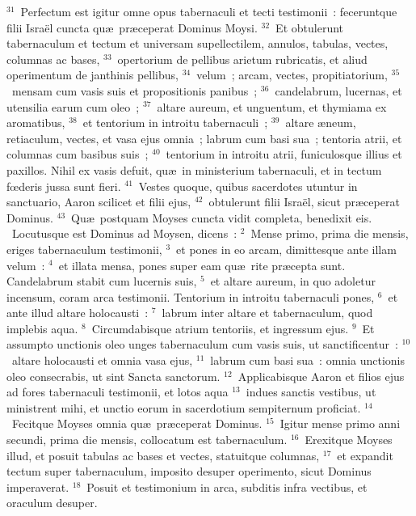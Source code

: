 ${}^{31}$~Perfectum est igitur omne opus tabernaculi et tecti testimonii~: feceruntque filii Isra\"el cuncta qu\ae\ pr\ae ceperat Dominus Moysi.
${}^{32}$~Et obtulerunt tabernaculum et tectum et universam supellectilem, annulos, tabulas, vectes, columnas ac bases,
${}^{33}$~opertorium de pellibus arietum rubricatis, et aliud operimentum de janthinis pellibus,
${}^{34}$~velum~; arcam, vectes, propitiatorium,
${}^{35}$~mensam cum vasis suis et propositionis panibus~;
${}^{36}$~candelabrum, lucernas, et utensilia earum cum oleo~;
${}^{37}$~altare aureum, et unguentum, et thymiama ex aromatibus,
${}^{38}$~et tentorium in introitu tabernaculi~;
${}^{39}$~altare \ae neum, retiaculum, vectes, et vasa ejus omnia~; labrum cum basi sua~; tentoria atrii, et columnas cum basibus suis~;
${}^{40}$~tentorium in introitu atrii, funiculosque illius et paxillos. Nihil ex vasis defuit, qu\ae\ in ministerium tabernaculi, et in tectum fœderis jussa sunt fieri.
${}^{41}$~Vestes quoque, quibus sacerdotes utuntur in sanctuario, Aaron scilicet et filii ejus,
${}^{42}$~obtulerunt filii Isra\"el, sicut pr\ae ceperat Dominus.
${}^{43}$~Qu\ae\ postquam Moyses cuncta vidit completa, benedixit eis.
~Locutusque est Dominus ad Moysen, dicens~:
${}^{2}$~Mense primo, prima die mensis, eriges tabernaculum testimonii,
${}^{3}$~et pones in eo arcam, dimittesque ante illam velum~:
${}^{4}$~et illata mensa, pones super eam qu\ae\ rite pr\ae cepta sunt. Candelabrum stabit cum lucernis suis,
${}^{5}$~et altare aureum, in quo adoletur incensum, coram arca testimonii. Tentorium in introitu tabernaculi pones,
${}^{6}$~et ante illud altare holocausti~:
${}^{7}$~labrum inter altare et tabernaculum, quod implebis aqua.
${}^{8}$~Circumdabisque atrium tentoriis, et ingressum ejus.
${}^{9}$~Et assumpto unctionis oleo unges tabernaculum cum vasis suis, ut sanctificentur~:
${}^{10}$~altare holocausti et omnia vasa ejus,
${}^{11}$~labrum cum basi sua~: omnia unctionis oleo consecrabis, ut sint Sancta sanctorum.
${}^{12}$~Applicabisque Aaron et filios ejus ad fores tabernaculi testimonii, et lotos aqua
${}^{13}$~indues sanctis vestibus, ut ministrent mihi, et unctio eorum in sacerdotium sempiternum proficiat.
${}^{14}$~Fecitque Moyses omnia qu\ae\ pr\ae ceperat Dominus.
${}^{15}$~Igitur mense primo anni secundi, prima die mensis, collocatum est tabernaculum.
${}^{16}$~Erexitque Moyses illud, et posuit tabulas ac bases et vectes, statuitque columnas,
${}^{17}$~et expandit tectum super tabernaculum, imposito desuper operimento, sicut Dominus imperaverat.
${}^{18}$~Posuit et testimonium in arca, subditis infra vectibus, et oraculum desuper.
